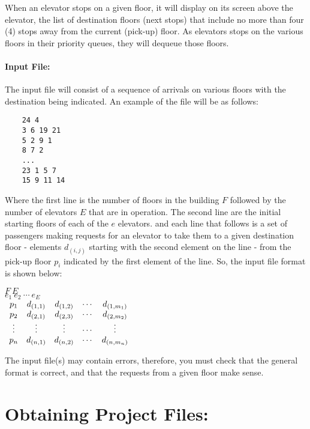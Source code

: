 \documentclass[10pt]{article}
\begin{document}
When an elevator stops on a given floor, it will display on its screen above the elevator, the list of destination floors (next stops) that include no more than four (4) stops away from the current (pick-up) floor. As elevators stops on the various floors in their priority queues, they will dequeue those floors. 

\paragraph{Input File:} The input file will consist of a sequence of arrivals on various floors with the destination being indicated. An example of the file will be as follows: 
\begin{verbatim}
	24 4
	3 6 19 21
	5 2 9 1
	8 7 2
	...
	23 1 5 7
	15 9 11 14
\end{verbatim}

Where the first line is the number of floors in the building $F$ followed by the number of elevators $E$ that are in operation. The second line are the initial starting floors of each of the $e$ elevators. and each line that follows is a set of passengers making requests for an elevator to take them to a given destination floor - elements $d_{(i,j)}$ starting with the second element on the line - from the pick-up floor $p_{i}$ indicated by the first element of the line. So, the input file format is shown below: 
\begin{flushleft}
	$F\ E$ \\
	$e_{1}\ e_{2}\ \cdots\ e_{E}$ \\
	$ \begin{array}{c c c c c}
	p_{1} & d_{(1,1)} & d_{(1,2)} & \cdots & d_{(1,m_{1})} \\
	p_{2} & d_{(2,1)} & d_{(2,3)} & \cdots & d_{(2,m_{2})} \\
	\vdots & \vdots & \vdots & \cdots & \vdots \\
	p_{n} & d_{(n,1)} & d_{(n,2)} & \cdots & d_{(n,m_{n})}
    \end{array} $
\end{flushleft}

The input file(s) may contain errors, therefore, you must check that the general format is correct, and that the requests from a given floor make sense. 

\section*{Obtaining Project Files:}
\end{document}
